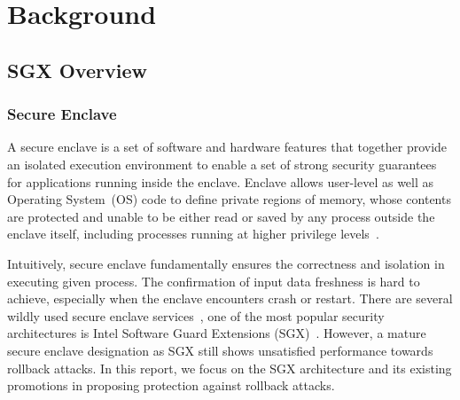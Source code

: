\section{Background}
\subsection{SGX Overview}
\subsubsection{Secure Enclave}
A secure enclave is a set of software and hardware features that together provide an isolated execution environment to enable a set of strong security guarantees for applications running inside the enclave. Enclave allows user-level as well as Operating System~(OS) code to define private regions of memory, whose contents are protected and unable to be either read or saved by any process outside the enclave itself, including processes running at higher privilege levels~\cite{}. 



Intuitively, secure enclave fundamentally ensures the correctness and isolation in executing given process. The confirmation of input data freshness is hard to achieve, especially when the enclave encounters crash or restart. There are several wildly used secure enclave services~\cite{}, one of the most popular security architectures is Intel Software Guard Extensions (SGX)~\cite{}. However, a mature secure enclave designation as SGX still shows unsatisfied performance towards rollback attacks. In this report, we focus on the SGX architecture and its existing promotions in proposing protection against rollback attacks.

